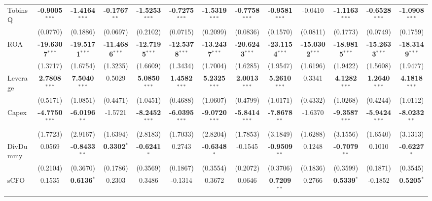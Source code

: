 \begin{landscape}
\begin{table}[H]
\begin{tabular}{lcccccccccccc}
TobinsQ & \textbf{-0.9005}$^{***}$ & \textbf{-1.4164}$^{***}$ & \textbf{-0.1767}$^{**}$ & \textbf{-1.5253}$^{***}$ & \textbf{-0.7275}$^{***}$ & \textbf{-1.5319}$^{***}$ & \textbf{-0.7758}$^{***}$ & \textbf{-0.9581}$^{***}$ & -0.0410 & \textbf{-1.1163}$^{***}$ & \textbf{-0.6528}$^{***}$ & \textbf{-1.0908}$^{***}$ \\
 & (0.0770) & (0.1886) & (0.0697) & (0.2102) & (0.0715) & (0.2099) & (0.0836) & (0.1570) & (0.0811) & (0.1773) & (0.0749) & (0.1759) \\
ROA & \textbf{-19.6307}$^{***}$ & \textbf{-19.5171}$^{***}$ & \textbf{-11.4686}$^{***}$ & \textbf{-12.7195}$^{***}$ & \textbf{-12.5378}$^{***}$ & \textbf{-13.2437}$^{***}$ & \textbf{-20.6243}$^{***}$ & \textbf{-23.1154}$^{***}$ & \textbf{-15.0302}$^{***}$ & \textbf{-18.9815}$^{***}$ & \textbf{-15.2633}$^{***}$ & \textbf{-18.3149}$^{***}$ \\
 & (1.3717) & (1.6754) & (1.3235) & (1.6609) & (1.3434) & (1.7004) & (1.6285) & (1.9547) & (1.6196) & (1.9422) & (1.5608) & (1.9477) \\
Leverage & \textbf{2.7808}$^{***}$ & \textbf{7.5040}$^{***}$ & 0.5029 & \textbf{5.0850}$^{***}$ & \textbf{1.4582}$^{***}$ & \textbf{5.2325}$^{***}$ & \textbf{2.0013}$^{***}$ & \textbf{5.2610}$^{***}$ & 0.3341 & \textbf{4.1282}$^{***}$ & \textbf{1.2640}$^{***}$ & \textbf{4.1818}$^{***}$ \\
 & (0.5171) & (1.0851) & (0.4471) & (1.0451) & (0.4688) & (1.0607) & (0.4799) & (1.0171) & (0.4332) & (1.0268) & (0.4244) & (1.0112) \\
Capex & \textbf{-4.7750}$^{***}$ & \textbf{-6.0196}$^{**}$ & -1.5721 & \textbf{-8.2452}$^{***}$ & \textbf{-6.0395}$^{***}$ & \textbf{-9.0720}$^{***}$ & \textbf{-5.8414}$^{***}$ & \textbf{-7.8678}$^{**}$ & -1.6370 & \textbf{-9.3587}$^{***}$ & \textbf{-5.9424}$^{***}$ & \textbf{-8.0232}$^{**}$ \\
 & (1.7723) & (2.9167) & (1.6394) & (2.8183) & (1.7033) & (2.8204) & (1.7853) & (3.1849) & (1.6288) & (3.1556) & (1.6540) & (3.1313) \\
DivDummy & 0.0569 & \textbf{-0.8433}$^{**}$ & \textbf{0.3302}$^{*}$ & \textbf{-0.6241}$^{*}$ & 0.2743 & \textbf{-0.6348}$^{*}$ & -0.1545 & \textbf{-0.9509}$^{**}$ & 0.1248 & \textbf{-0.7079}$^{**}$ & 0.1010 & \textbf{-0.6227}$^{*}$ \\
 & (0.2104) & (0.3670) & (0.1786) & (0.3569) & (0.1867) & (0.3554) & (0.2072) & (0.3706) & (0.1836) & (0.3599) & (0.1871) & (0.3545) \\
sCFO & 0.1535 & \textbf{0.6136}$^{*}$ & 0.2303 & 0.3486 & -0.1314 & 0.3672 & 0.0646 & \textbf{0.7209}$^{**}$ & 0.2766 & \textbf{0.5339}$^{*}$ & -0.1852 & \textbf{0.5205}$^{*}$ \\

\end{tabular}
\end{table}
\end{landscape}
